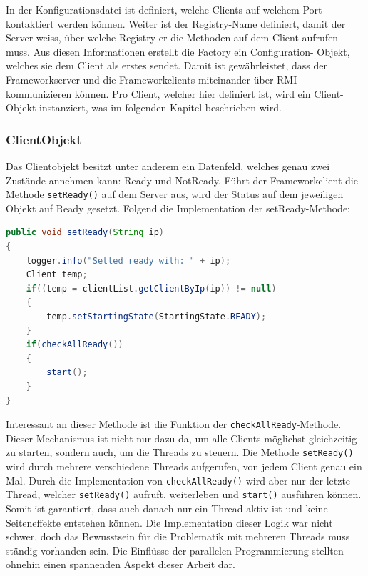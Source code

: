 In der Konfigurationsdatei ist definiert, welche Clients auf welchem Port kontaktiert werden können. Weiter ist der Registry-Name definiert, damit der Server weiss, über welche Registry er die Methoden auf dem Client aufrufen muss. \newline
Aus diesen Informationen erstellt die Factory ein Configuration- Objekt, welches sie dem Client als erstes sendet. Damit ist gewährleistet, dass der Frameworkserver und die Frameworkclients miteinander über RMI kommunizieren können. \newline
Pro Client, welcher hier definiert ist, wird ein Client-Objekt instanziert, was im folgenden Kapitel beschrieben wird.

\subsubsection{ClientObjekt}
\label{sec:ClientObjekt}

Das Clientobjekt besitzt unter anderem ein Datenfeld, welches genau zwei Zustände annehmen kann: Ready und NotReady. Führt der Frameworkclient die Methode \texttt{setReady()} auf dem Server aus, wird der Status auf dem jeweiligen Objekt auf Ready gesetzt. Folgend die Implementation der setReady-Methode:
\begin{lstlisting}[language=Java, breaklines=true]
public void setReady(String ip) 
{
	logger.info("Setted ready with: " + ip);
	Client temp;
	if((temp = clientList.getClientByIp(ip)) != null)
	{
		temp.setStartingState(StartingState.READY);
	}
	if(checkAllReady())
	{
		start();
	}
}
\end{lstlisting}

Interessant an dieser Methode ist die Funktion der \texttt{checkAllReady}-Methode. Dieser Mecha\-nismus ist nicht nur dazu da, um alle Clients mög\-lichst gleichzeitig zu starten, sondern auch, um die Threads zu steuern. Die Methode \texttt{setReady()} wird durch mehrere verschiedene Threads aufgerufen, von jedem Client genau ein Mal. Durch die Implementation von \texttt{checkAllReady()} wird aber nur der letzte Thread, welcher \texttt{setReady()} aufruft, weiterleben und \texttt{start()} ausführen können. Somit ist garantiert, dass auch danach nur ein Thread aktiv ist und keine Seiteneffekte entstehen können.\newline
Die Implementation dieser Logik war nicht schwer, doch das Bewusstsein für die Problematik mit mehreren Threads muss ständig vorhanden sein. Die Einflüsse der parallelen Programmierung stellten ohnehin einen spannenden Aspekt dieser Arbeit dar. 

